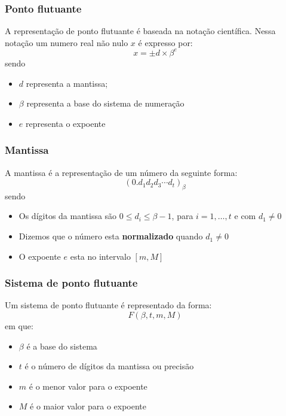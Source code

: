 \documentclass{beamer}
\begin{document}
\begin{frame}
	\frametitle{Ponto flutuante}
	A representação de ponto flutuante é baseada na notação científica. Nessa notação um numero real não nulo $ x $ é expresso por:
	\begin{equation*}
		x = \pm d \times \beta^{e}
	\end{equation*}
	sendo 
	\begin{itemize}
		\item $ d $ representa a mantissa;
		\item $ \beta $ representa a base do sistema de numeração
		\item $ e $ representa o expoente
	\end{itemize}	
\end{frame}

\begin{frame}
	\frametitle{Mantissa}
	A mantissa é a representação de um número da seguinte forma:
	\begin{equation*}
		(0. d_{1} d_{2} d_{3}\cdots d_{t})_{\beta}
	\end{equation*}
	sendo
	\begin{itemize}
		\item Os dígitos da mantissa são $ 0 \leq d_{i} \leq \beta - 1 $, para $ i = 1, \ldots, t $ e com $ d_{1} \neq 0 $
		\item Dizemos que o número esta \textbf{normalizado} quando $ d_{1} \neq 0 $
		\item O expoente $ e $ esta no intervalo $ [m, M] $
	\end{itemize}
\end{frame}

\begin{frame}
	\frametitle{Sistema de ponto flutuante}
	Um sistema de ponto flutuante é representado da forma:
	\begin{equation*}
		F(\beta, t, m, M)
	\end{equation*}
	em que:
	\begin{itemize}
		\item $ \beta $ é a base do sistema
		\item $ t $ é o número de dígitos da mantissa ou precisão
		\item $ m $ é o menor valor para o expoente
		\item $ M $	é o maior valor para o expoente
	\end{itemize}
\end{frame}
\end{document}
